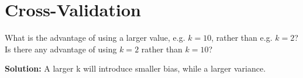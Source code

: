 
\section{Cross-Validation}

What is the advantage of using a larger value, e.g. $k=10$, rather than e.g. $k=2$? Is there any advantage of using $k=2$ rather than $k=10$?

{\bf Solution:} A larger k will introduce smaller bias, while a larger variance. 